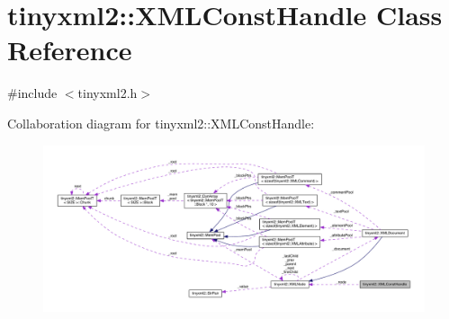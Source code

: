 \hypertarget{classtinyxml2_1_1_x_m_l_const_handle}{}\section{tinyxml2\+:\+:X\+M\+L\+Const\+Handle Class Reference}
\label{classtinyxml2_1_1_x_m_l_const_handle}


{\ttfamily \#include $<$tinyxml2.\+h$>$}



Collaboration diagram for tinyxml2\+:\+:X\+M\+L\+Const\+Handle\+:\nopagebreak
\begin{figure}[H]
\begin{center}
\leavevmode
\includegraphics[width=350pt]{classtinyxml2_1_1_x_m_l_const_handle__coll__graph}
\end{center}
\end{figure}

